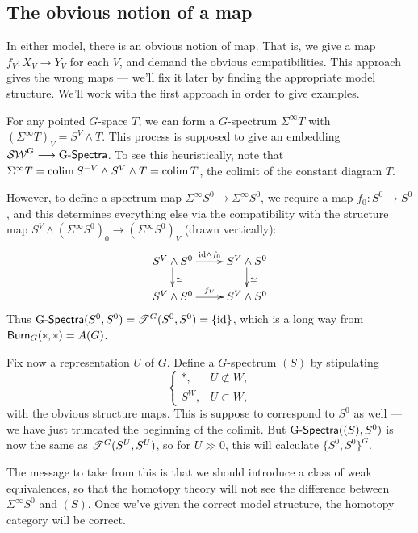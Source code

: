 \documentclass[11pt]{article}
\begin{document}
\begin{FourthWeek}
\subsection*{The obvious notion of a map}
In either model, there is an obvious notion of map. That is, we give a map $f_V:X_V\to Y_V$ for each $V$, and demand the obvious compatibilities. This approach gives the wrong maps --- we'll fix it later by finding the appropriate model structure. We'll work with the first approach in order to give examples.
\begin{exmp*}
For any pointed $G$-space $T$, we can form a $G$-spectrum $\Sigma^\infty T$ with $(\Sigma^\infty T)_V=S^V\wedge T$. This process is supposed to give an embedding $\operatorname{{\mathcal{SW}^G}}\longrightarrow\operatorname{{G-\mathsf{Spectra}}}$. To see this heuristically, note that $\Sigma^\infty T=\operatorname{colim} S^{-V}\wedge S^V\wedge T=\operatorname{colim} T$, the colimit of the constant diagram $T$. 

However, to define a spectrum map $\Sigma^\infty S^0\to \Sigma^\infty S^0$, we require a map $f_0:S^0\to S^0$, and this determines everything else via the compatibility with the structure map $S^V\wedge(\Sigma^\infty S^0)_0\to(\Sigma^\infty S^0)_V$ (drawn vertically):
\[\xymatrix@R=.6cm{ 
\ar[d]^\simeq S^V\wedge S^0\ar[r]^{\id\wedge f_0}&S^V\wedge S^0\ar[d]^\simeq\\
S^V\wedge S^0\ar[r]^{f_V}&S^V\wedge S^0
}\]
Thus $\operatorname{{G-\mathsf{Spectra}}}(S^0,S^0)=\mathscr{T}^G(S^0,S^0)=\{\textup{id}\}$, which is a long way from $\operatorname{{\mathsf{Burn}}}_G(*,*)=A(G)$.
\end{exmp*}
Fix now a representation $U$ of $G$. Define a $G$-spectrum $(S)$ by stipulating
\[\begin{cases} *,&U\not\subset W,\\ S^W,&U\subset W,\end{cases}\]
with the obvious structure maps. This is suppose to correspond to $S^0$ as well --- we have just truncated the beginning of the colimit. But $\operatorname{{G-\mathsf{Spectra}}}((S),S^0)$ is now the same as $\mathscr{T}^G(S^U,S^U)$, so for $U\gg0$, this will calculate $\{S^0,S^0\}^G$.

The message to take from this is that we should introduce a class of weak equivalences, so that the homotopy theory will not see the difference between $\Sigma^\infty S^0$ and $(S)$. Once we've given the correct model structure, the homotopy category will be correct.
\end{FourthWeek}
\end{document}

